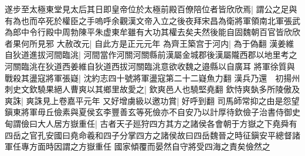 遂步至太極東堂見太后其日即皇帝位於太極前殿百僚陪位者皆欣欣焉|{
	謂公之足與有為也而卒死於權臣之手嗚呼余觀漢文帝入立之後夜拜宋昌為衛將軍領南北軍張武為郎中令行殿中周勃陳平朱虚東牟雖有大功其權去矣夫然後能自固魏朝百官皆欣欣者果何所見邪}
大赦改元|{
	自此方是正元元年}
為齊王築宫于河内|{
	為于偽翻}
漢姜維自狄道進拔河間臨洮|{
	河間當作河關河關縣前漢屬金城郡後漢屬隴西郡以地里考之河關臨洮在狄道西姜維自狄道西拔河關臨洮意欲收魏之邉縣以自廣耳}
將軍徐質與戰殺其盪寇將軍張嶷|{
	沈約志四十號將軍盪寇第二十二嶷魚力翻}
漢兵乃還　初揚州刺史文欽驍果絕人曹爽以其鄉里故愛之|{
	欽爽邑人也驍堅堯翻}
欽恃爽埶多所陵傲及爽誅|{
	爽誅見上卷嘉平元年}
又好增虜級以邀功賞|{
	好呼到翻}
司馬師常抑之由是怨望鎭東將軍毋丘儉素與夏侯玄李豐善玄等死儉亦不自安乃以計厚待欽儉子治書侍御史甸謂儉曰大人居方嶽重任|{
	古者天子廵狩四方其方之諸侯各會朝于方嶽之下堯舜有四岳之官孔安國曰堯命羲和四子分掌四方之諸侯故曰四岳魏晉之時征鎭安平總督諸軍任專方面時因謂之方嶽重任}
國家傾覆而晏然自守將受四海之責矣儉然之

